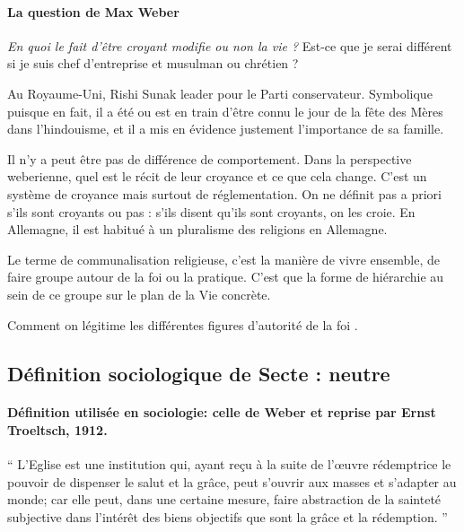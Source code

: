 \paragraph{La question de Max Weber}

\textit{En quoi le fait d'être croyant modifie ou non la vie ? }
Est-ce que je serai différent si je suis chef d'entreprise et musulman ou chrétien ? 
\begin{Ex}
    Au Royaume-Uni, Rishi Sunak leader pour le Parti conservateur. Symbolique puisque en fait, il a été ou est en train d'être connu le jour de la fête des Mères dans l'hindouisme, et il a mis en évidence justement l'importance de sa famille.
\end{Ex}
Il n'y a peut être pas de différence de comportement. Dans la perspective weberienne, quel est le récit de leur croyance et ce que cela change. C'est  un système de croyance mais surtout de réglementation. On ne définit pas a priori s'ils sont croyants ou pas : s'ils disent qu'ils sont croyants, on les croie. 
En Allemagne, il est habitué à un pluralisme des religions en Allemagne.


\begin{Def}
  Le terme de communalisation religieuse,  c'est la manière de vivre ensemble, de faire groupe autour de la foi ou la pratique. C'est que la forme de hiérarchie au sein de ce groupe sur le plan de la Vie concrète.
\end{Def}

Comment on légitime les différentes figures d'autorité de la foi . 

\subsection{Définition sociologique de Secte : neutre}
 
\paragraph{Définition utilisée en sociologie: celle de Weber et reprise par Ernst Troeltsch, 1912.}
\begin{Def}
“ L’Eglise est une institution qui, ayant reçu à la suite de l’œuvre rédemptrice le pouvoir de dispenser
le salut et la grâce, peut s’ouvrir aux masses et s’adapter au monde; car elle peut, dans une certaine
mesure, faire abstraction de la sainteté subjective dans l’intérêt des biens objectifs que sont la grâce
et la rédemption. ”
\end{Def}


